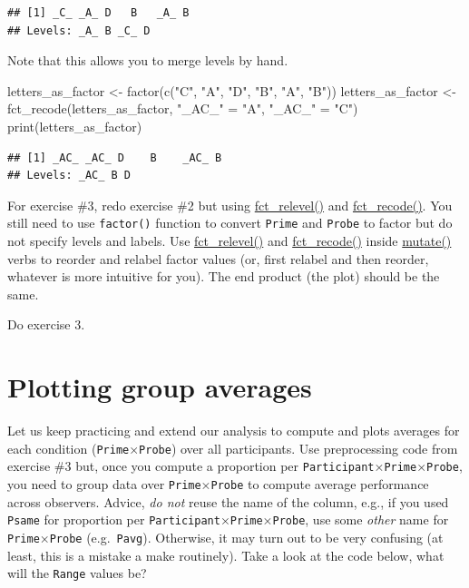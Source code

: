 \documentclass[
]{book}
\newenvironment{Shaded}{\begin{snugshade}}{\end{snugshade}}
\newcommand{\FunctionTok}[1]{\textcolor[rgb]{0.00,0.00,0.00}{#1}}
\newcommand{\NormalTok}[1]{#1}
\newcommand{\OtherTok}[1]{\textcolor[rgb]{0.56,0.35,0.01}{#1}}
\newcommand{\StringTok}[1]{\textcolor[rgb]{0.31,0.60,0.02}{#1}}
\begin{document}
\begin{verbatim}
## [1] _C_ _A_ D   B   _A_ B  
## Levels: _A_ B _C_ D
\end{verbatim}

Note that this allows you to merge levels by hand.

\begin{Shaded}
\begin{Highlighting}[]
\NormalTok{letters\_as\_factor }\OtherTok{\textless{}{-}} \FunctionTok{factor}\NormalTok{(}\FunctionTok{c}\NormalTok{(}\StringTok{"C"}\NormalTok{, }\StringTok{"A"}\NormalTok{, }\StringTok{"D"}\NormalTok{, }\StringTok{"B"}\NormalTok{, }\StringTok{"A"}\NormalTok{, }\StringTok{"B"}\NormalTok{))}
\NormalTok{letters\_as\_factor }\OtherTok{\textless{}{-}} \FunctionTok{fct\_recode}\NormalTok{(letters\_as\_factor, }\StringTok{"\_AC\_"} \OtherTok{=} \StringTok{"A"}\NormalTok{, }\StringTok{"\_AC\_"} \OtherTok{=} \StringTok{"C"}\NormalTok{)}
\FunctionTok{print}\NormalTok{(letters\_as\_factor)}
\end{Highlighting}
\end{Shaded}

\begin{verbatim}
## [1] _AC_ _AC_ D    B    _AC_ B   
## Levels: _AC_ B D
\end{verbatim}

For exercise \#3, redo exercise \#2 but using \href{https://forcats.tidyverse.org/reference/fct_relevel.html}{fct\_relevel()} and \href{https://forcats.tidyverse.org/reference/fct_recode.html}{fct\_recode()}. You still need to use \texttt{factor()} function to convert \texttt{Prime} and \texttt{Probe} to factor but do not specify levels and labels. Use \href{https://forcats.tidyverse.org/reference/fct_relevel.html}{fct\_relevel()} and \href{https://forcats.tidyverse.org/reference/fct_recode.html}{fct\_recode()} inside \href{https://dplyr.tidyverse.org/reference/mutate.html}{mutate()} verbs to reorder and relabel factor values (or, first relabel and then reorder, whatever is more intuitive for you). The end product (the plot) should be the same.

Do exercise 3.

\hypertarget{plotting-group-averages}{%
\section{Plotting group averages}\label{plotting-group-averages}}

Let us keep practicing and extend our analysis to compute and plots averages for each condition (\texttt{Prime}×\texttt{Probe}) over all participants. Use preprocessing code from exercise \#3 but, once you compute a proportion per \texttt{Participant}×\texttt{Prime}×\texttt{Probe}, you need to group data over \texttt{Prime}×\texttt{Probe} to compute average performance across observers. Advice, \emph{do not} reuse the name of the column, e.g., if you used \texttt{Psame} for proportion per \texttt{Participant}×\texttt{Prime}×\texttt{Probe}, use some \emph{other} name for \texttt{Prime}×\texttt{Probe} (e.g.~\texttt{Pavg}). Otherwise, it may turn out to be very confusing (at least, this is a mistake a make routinely). Take a look at the code below, what will the \texttt{Range} values be?
\end{document}
